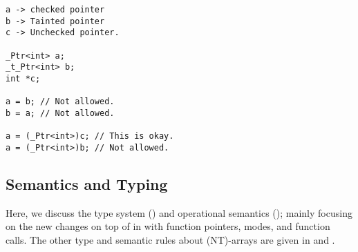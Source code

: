 
\begin{verbatim}
a -> checked pointer
b -> Tainted pointer
c -> Unchecked pointer.

_Ptr<int> a;
_t_Ptr<int> b;
int *c;

a = b; // Not allowed.
b = a; // Not allowed.

a = (_Ptr<int>)c; // This is okay.
a = (_Ptr<int>)b; // Not allowed.
\end{verbatim}

\subsection{Semantics and Typing}\label{sec:semantics}



Here, we discuss the \lang type system () and operational semantics (); 
mainly focusing on the new changes on top of \checkedc in \cite{li22checkedc} with function pointers, modes, and function calls.
The other type and semantic rules about (NT)-arrays are given in \cite{li22checkedc} and .

